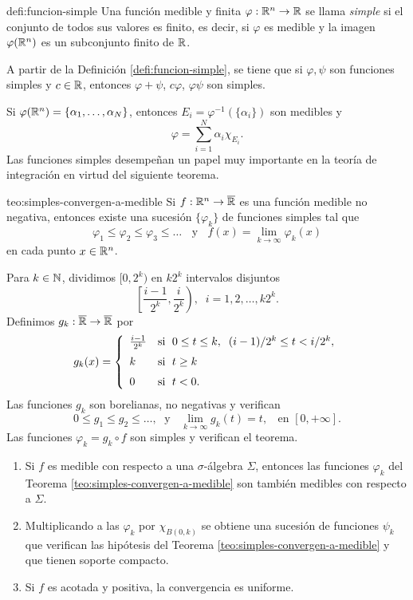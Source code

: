 \begin{definicion}{defi:funcion-simple}
Una funci\'on medible y finita  $\varphi:\mathbb{R}^n \to \mathbb{R}$ 
se llama \emph{simple} si el conjunto de todos sus valores es finito, es decir, si $\varphi$ es medible y la imagen  $\varphi(\mathbb{R}^n)$ es un subconjunto finito de $\mathbb{R}$.
\end{definicion}

A partir de la Definici\'on \ref{defi:funcion-simple}, se tiene que si $\varphi,\psi$ son funciones simples y $c \in \mathbb{R}$, entonces $\varphi + \psi$, $c\varphi$,  $\varphi \psi$ son simples.

Si $\varphi(\mathbb{R}^n)=\{\alpha_1,\ldots,\alpha_N\}$, entonces $E_i=\varphi^{-1}(\{\alpha_i\})$ son medibles y 
\[
\varphi=\sum\limits_{i=1}^N \alpha_i \chi_{E_i}.
\]
Las funciones simples desempe\~nan un papel muy importante en la teor\'ia de integraci\'on en virtud del siguiente teorema.

\begin{teorema}{teo:simples-convergen-a-medible}
Si $f:\mathbb{R}^n \to \overline{\mathbb{R}}$ es una funci\'on medible no negativa, entonces existe una sucesi\'on $\{\varphi_k\}$ de funciones simples tal que
\[
\varphi_1\leq \varphi_2 \leq \varphi_3\leq \ldots \;\;\mbox{ y }\;\;
f(x)=\lim\limits_{k \to \infty} \varphi_k(x)
\]
en cada punto $x \in \mathbb{R}^n$.
\end{teorema}

\begin{demo}
Para $k \in \mathbb{N}$, dividimos $[0,2^k)$ en $k2^k$ intervalos disjuntos
\[
\left[\frac{i-1}{2^k},\frac{i}{2^k}\right), \;\;i=1,2,\ldots,k2^k.
\]
Definimos $g_k:\overline{\mathbb{R}} \to \overline{\mathbb{R}}$ por
\[
g_k(x)=
\left\{
\begin{array}{ll}
    \frac{i-1}{2^k} & \mbox{si }\; 0\leq t\leq k, \;\; (i-1)/2^k\leq t< i/2^k, 
    \medskip
    \\
    k     & \mbox{si }\;t\geq k
    \medskip
    \\
    0     & \mbox{si }\; t<0.
\end{array}
\right.
\]
Las funciones $g_k$ son borelianas, no negativas y verifican
\[
0\leq g_1\leq g_2\leq \ldots,\;\mbox{ y }\;\;
\lim\limits_{k \to \infty} g_k(t)=t, \;\;\mbox{ en } [0, +\infty].
\]
Las funciones $\varphi_k = g_k \circ f$ son simples y verifican  el teorema.
\end{demo}

\begin{observacion}{}
\begin{enumerate}
    \item Si $f$ es medible con respecto a una $\sigma$-\'algebra $\Sigma$, entonces las funciones $\varphi_k$ del Teorema \ref{teo:simples-convergen-a-medible} son tambi\'en medibles con respecto a $\Sigma$.
    \item Multiplicando a las $\varphi_k$ por $\chi_{B(0,k)}$ se obtiene una sucesi\'on de  funciones $\psi_k$ que verifican las hip\'otesis del Teorema \ref{teo:simples-convergen-a-medible} y que tienen soporte compacto.
    \item Si $f$ es acotada y positiva,  la convergencia es uniforme.
\end{enumerate}
\end{observacion}

